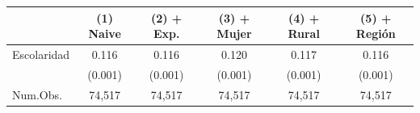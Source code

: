 \begin{table}
\centering
\begin{tabular}[t]{lccccc}
\toprule
  & (1) Naive & (2) + Exp. & (3) + Mujer & (4) + Rural & (5) + Región\\
\midrule
Escolaridad & 0.116 & 0.116 & 0.120 & 0.117 & 0.116\\
 & (0.001) & (0.001) & (0.001) & (0.001) & (0.001)\\
\midrule
Num.Obs. & 74,517 & 74,517 & 74,517 & 74,517 & 74,517\\
\bottomrule
\end{tabular}
\end{table}
